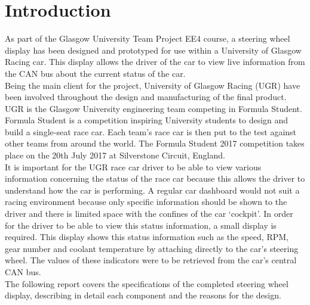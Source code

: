 \documentclass[a4paper,12pt]{article}
\begin{document}

\newpage
\tableofcontents


\newpage
\section{Introduction}
\label{sec:introduction}

As part of the Glasgow University Team Project EE4 course, a steering wheel display has been designed and prototyped for use within a University of Glasgow Racing car. This display allows the driver of the car to view live information from the CAN bus about the current status of the car. \\

Being the main client for the project, University of Glasgow Racing (UGR) have been involved throughout the design and manufacturing of the final product. UGR is the Glasgow University engineering team competing in Formula Student. Formula Student is a competition inspiring University students to design and build a single-seat race car. Each team’s race car is then put to the test against other teams from around the world. The Formula Student 2017 competition takes place on the 20th July 2017 at Silverstone Circuit, England. \\

It is important for the UGR race car driver to be able to view various information concerning the status of the race car because this allows the driver to understand how the car is performing. A regular car dashboard would not suit a racing environment because only specific information should be shown to the driver and there is limited space with the confines of the car `cockpit'. In order for the driver to be able to view this status information, a small display is required. This display shows this status information such as the speed, RPM, gear number and coolant temperature by attaching directly to the car’s steering wheel. The values of these indicators were to be retrieved from the car's central CAN bus. \\

The following report covers the specifications of the completed steering wheel display, describing in detail each component and the reasons for the design. \\
\end{document}
